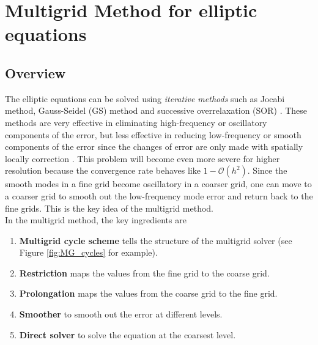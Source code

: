 \section{Multigrid Method for elliptic equations} %
\label{section3.1}

\subsection{Overview} %
\label{section3.1.1}
The elliptic equations can be solved using \textit{iterative methods} such as
Jocabi method, Gauss-Seidel (GS) method and successive overrelaxation (SOR) \cite{young2014iterative}.
These methods are very effective in eliminating high-frequency or
oscillatory components of the error,
but less effective in reducing low-frequency or smooth components of the error
since the changes of error are only made with spatially locally correction \cite{briggs2000multigrid}.
This problem will become even more severe for higher resolution 
because the convergence rate behaves like $1-\mathcal{O}(h^2)$.
Since the smooth modes in a fine grid become oscillatory in a coarser grid,
one can move to a coarser grid to smooth out the low-frequency mode error and return back to the fine grids.
This is the key idea of the multigrid method.\\
In the multigrid method, the key ingredients are
\begin{enumerate}[label=(\roman*)]
    \item \textbf{Multigrid cycle scheme} tells the structure of the multigrid solver (see Figure \ref{fig:MG_cycles} for example).
    \item \textbf{Restriction} maps the values from the fine grid to the coarse grid.
    \item \textbf{Prolongation} maps the values from the coarse grid to the fine grid.
    \item \textbf{Smoother} to smooth out the error at different levels.
    \item \textbf{Direct solver} to solve the equation at the coarsest level.
\end{enumerate}
